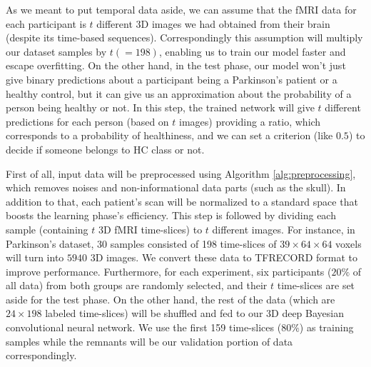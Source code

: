 \documentclass[a4paper,fleqn]{cas-dc}
\begin{document}
As we meant to put temporal data aside, we can assume that the fMRI data for each participant is $t$ different 3D images we had obtained from their brain (despite its time-based sequences). Correspondingly this assumption will multiply our dataset samples by $t (=198)$, enabling us to train our model faster and escape overfitting. On the other hand, in the test phase, our model won't just give binary predictions about a participant being a Parkinson's patient or a healthy control, but it can give us an approximation about the probability of a person being healthy or not. In this step, the trained network will give $t$ different predictions for each person (based on $t$ images) providing a ratio, which corresponds to a probability of healthiness, and we can set a criterion (like $0.5$) to decide if someone belongs to HC class or not.


First of all, input data will be preprocessed using Algorithm \ref{alg:preprocessing}, which removes noises and non-informational data parts (such as the skull). In addition to that, each patient's scan will be normalized to a standard space that boosts the learning phase's efficiency. This step is followed by dividing each sample (containing $t$ 3D fMRI time-slices) to $t$ different images. For instance, in Parkinson's dataset, 30 samples consisted of 198 time-slices of \texttt{$39 \times 64 \times 64$} voxels will turn into $5940$ 3D images. We convert these data to TFRECORD format to improve performance. Furthermore, for each experiment, six participants ($20\%$ of all data) from both groups are randomly selected, and their $t$ time-slices are set aside for the test phase. On the other hand, the rest of the data (which are $24 \times 198$ labeled time-slices) will be shuffled and fed to our 3D deep Bayesian convolutional neural network. We use the first 159 time-slices ($80\%$) as training samples while the remnants will be our validation portion of data correspondingly. 
\end{document}
